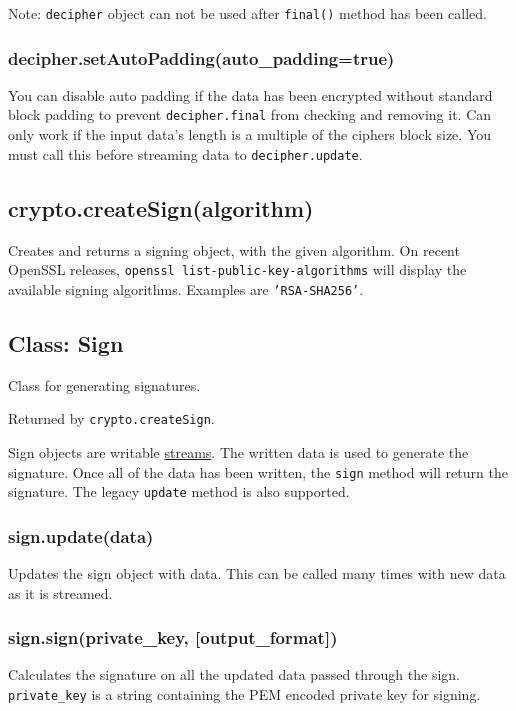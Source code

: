 Note: \texttt{decipher} object can not be used after \texttt{final()}
method has been called.

\subsubsection{decipher.setAutoPadding(auto\_padding=true)}

You can disable auto padding if the data has been encrypted without
standard block padding to prevent \texttt{decipher.final} from checking
and removing it. Can only work if the input data's length is a multiple
of the ciphers block size. You must call this before streaming data to
\texttt{decipher.update}.

\subsection{crypto.createSign(algorithm)}

Creates and returns a signing object, with the given algorithm. On
recent OpenSSL releases, \texttt{openssl list-public-key-algorithms}
will display the available signing algorithms. Examples are
\texttt{'RSA-SHA256'}.

\subsection{Class: Sign}

Class for generating signatures.

Returned by \texttt{crypto.createSign}.

Sign objects are writable \href{stream.html}{streams}. The written data
is used to generate the signature. Once all of the data has been
written, the \texttt{sign} method will return the signature. The legacy
\texttt{update} method is also supported.

\subsubsection{sign.update(data)}

Updates the sign object with data. This can be called many times with
new data as it is streamed.

\subsubsection{sign.sign(private\_key, {[}output\_format{]})}

Calculates the signature on all the updated data passed through the
sign. \texttt{private\_key} is a string containing the PEM encoded
private key for signing.


